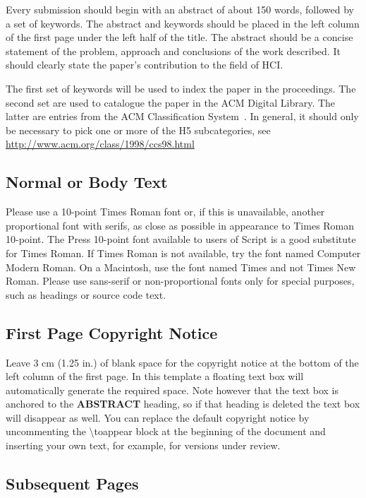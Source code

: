 \documentclass{sigchi}
\begin{document}
Every submission should begin with an abstract of about 150 words,
followed by a set of keywords. The abstract and keywords should be
placed in the left column of the first page under the left half of the
title. The abstract should be a concise statement of the problem,
approach and conclusions of the work described.  It should clearly
state the paper's contribution to the field of HCI.

The first set of keywords will be used to index the paper in the
proceedings. The second set are used to catalogue the paper in the ACM
Digital Library. The latter are entries from the ACM Classification
System~\cite{acm_categories}.  In general, it should only be necessary
to pick one or more of the H5 subcategories, see
\url{http://www.acm.org/class/1998/ccs98.html}

\subsection{Normal or Body Text}

Please use a 10-point Times Roman font or, if this is unavailable,
another proportional font with serifs, as close as possible in
appearance to Times Roman 10-point. The Press 10-point font available
to users of Script is a good substitute for Times Roman. If Times
Roman is not available, try the font named Computer Modern Roman. On a
Macintosh, use the font named Times and not Times New Roman. Please
use sans-serif or non-proportional fonts only for special purposes,
such as headings or source code text.

\subsection{First Page Copyright Notice}

Leave 3 cm (1.25 in.) of blank space for the copyright notice at the
bottom of the left column of the first page. In this template a
floating text box will automatically generate the required space. Note
however that the text box is anchored to the \textbf{ABSTRACT}
heading, so if that heading is deleted the text box will disappear as
well.  You can replace the default copyright notice by uncommenting
the {\textbackslash}toappear block at the beginning of the document
and inserting your own text, for example, for versions under review.

\subsection{Subsequent Pages}
\end{document}
